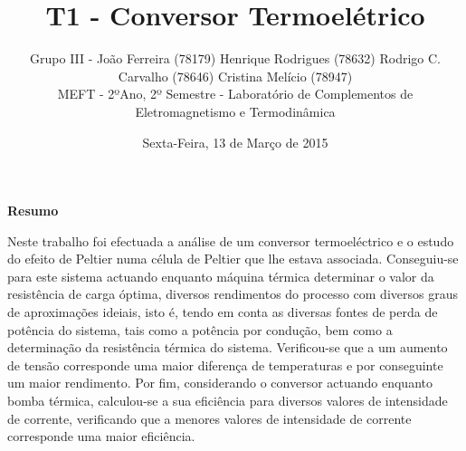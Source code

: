 \documentclass[9pt]{extarticle}
\renewenvironment{abstract}
 {\small
  \begin{center}
  \bfseries \abstractname\vspace{-.5em}\vspace{0pt}
  \end{center}
  \list{}{
    \setlength{\leftmargin}{0cm}%
    \setlength{\rightmargin}{\leftmargin}%
  }%
  \item\relax}
 {\endlist}
\renewcommand{\abstractname}{Resumo}
\begin{document}
\title {\bf \huge T1 - Conversor Termoelétrico}
\author
{{\small Grupo III - João Ferreira (78179) Henrique Rodrigues (78632) Rodrigo C. Carvalho (78646) Cristina Melício (78947)} \\
{\small MEFT - 2ºAno, 2º Semestre - Laboratório de Complementos de Eletromagnetismo e Termodinâmica}}
\date{{\small Sexta-Feira, 13 de Março de 2015}}
\maketitle

\begin{abstract}
\par Neste trabalho foi efectuada a análise de um conversor termoeléctrico e o estudo do efeito de Peltier numa célula de Peltier que lhe estava associada. Conseguiu-se para este sistema actuando enquanto máquina térmica determinar o valor da resistência de carga óptima, diversos rendimentos do processo com diversos graus de aproximações ideiais, isto é, tendo em conta as diversas fontes de perda de potência do sistema, tais como a potência por condução, bem como a determinação da resistência térmica do sistema. Verificou-se que a um aumento de tensão corresponde uma maior diferença de temperaturas e por conseguinte um maior rendimento. Por fim, considerando o conversor actuando enquanto bomba térmica, calculou-se a sua eficiência para diversos valores de intensidade de corrente, verificando que a menores valores de intensidade de corrente corresponde uma maior eficiência.
\end{abstract}
\end{document}
